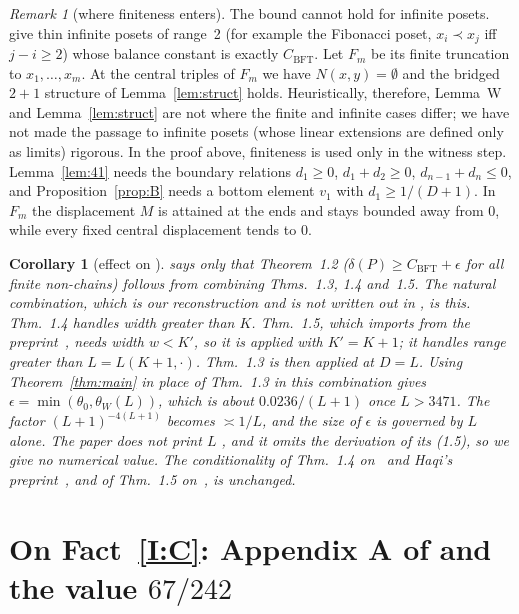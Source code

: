 \documentclass[10pt]{amsart}
\newtheorem{corollary}[theorem]{Corollary}
\theoremstyle{definition}
\theoremstyle{remark}
\newtheorem{remark}[theorem]{Remark}
\newcommand{\CB}{C_{\mathrm{BFT}}}
\newcommand{\tW}{\theta_W}
\begin{document}
\begin{remark}[where finiteness enters]
The bound cannot hold for infinite posets. \cite[\S1 (the poset $Q$) and Thm.~1.4]{BFT95} give thin infinite posets of range~2 (for example the Fibonacci poset, $x_i\prec x_j$ iff $j-i\ge2$) whose balance constant is exactly $\CB$.
Let $F_m$ be its finite truncation to $x_1,\dots,x_m$. At the central triples of $F_m$ we have $N(x,y)=\emptyset$ and the bridged $2+1$ structure of Lemma~\ref{lem:struct} holds.
Heuristically, therefore, Lemma~W and Lemma~\ref{lem:struct} are not where the finite and infinite cases differ; we have not made the passage to infinite posets (whose linear extensions are defined only as limits) rigorous.
In the proof above, finiteness is used only in the witness step. Lemma~\ref{lem:41} needs the boundary relations $d_1\ge0$, $d_1+d_2\ge0$, $d_{n-1}+d_n\le0$, and Proposition~\ref{prop:B} needs a bottom element $v_1$ with $d_1\ge1/(D+1)$.
In $F_m$ the displacement $M$ is attained at the ends and stays bounded away from $0$, while every fixed central displacement tends to $0$.
\end{remark}

\begin{corollary}[effect on {\cite[Thm.~1.2]{KSBFT}}]
\cite[p.~5]{KSBFT} says only that Theorem~1.2 ($\delta(P)\ge\CB+\epsilon$ for all finite non-chains) follows from combining Thms.~1.3, 1.4 and~1.5.
The natural combination, which is our reconstruction and is not written out in \cite{KSBFT}, is this.
Thm.~1.4 handles width greater than $K$. Thm.~1.5, which \cite{KSBFT} imports from the preprint~\cite{AK25b}, needs width $w<K'$, so it is applied with $K'=K+1$; it handles range greater than $L=L(K+1,\cdot)$. Thm.~1.3 is then applied at $D=L$.
Using Theorem~\ref{thm:main} in place of Thm.~1.3 in this combination gives $\epsilon=\min(\theta_0,\tW(L))$, which is about $0.0236/(L+1)$ once $L>3471$.
The factor $(L+1)^{-4(L+1)}$ becomes $\asymp 1/L$, and the size of $\epsilon$ is governed by $L$ alone.
The paper does not print $L$ \cite[p.~5]{KSBFT}, and it omits the derivation of its (1.5), so we give no numerical value.
The conditionality of Thm.~1.4 on~\cite{AK25a} and Haqi's preprint~\cite{Haq26}, and of Thm.~1.5 on~\cite{AK25b}, is unchanged.
\end{corollary}

\section{\texorpdfstring{On Fact~\ref{I:C}: Appendix A of \cite{KSBFT} and the value $67/242$}{On Fact I3: Appendix A and the value 67/242}}\label{sec:appA}
\end{document}
